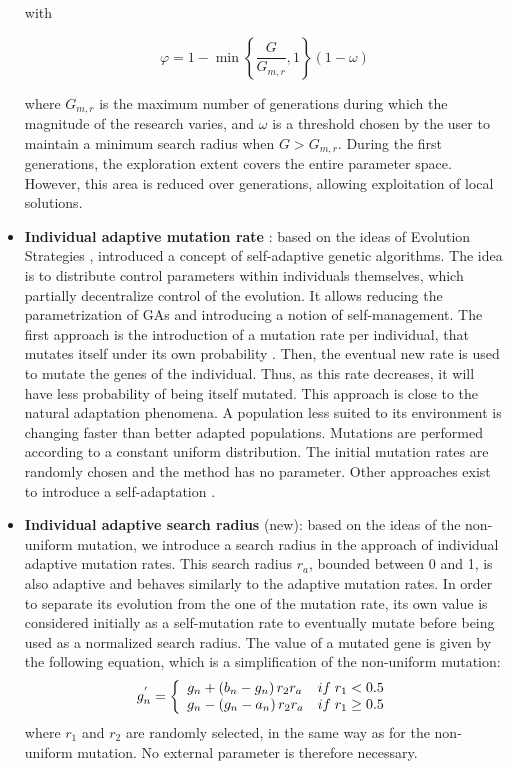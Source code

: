 \documentclass[twocol]{ametsoc}
\begin{document}
\begin{itemize}
	with 
	
	\begin{equation}
	\varphi = 1 - \min \left\lbrace \dfrac{G}{G_{m,r}}, 1 \right\rbrace \left(1-\omega\right)
	\end{equation}
	
	where $G_{m,r}$ is the maximum number of generations during which the magnitude of the research varies, and $\omega$ is a threshold chosen by the user to maintain a minimum search radius when $G>G_{m,r}$. During the first generations, the exploration extent covers the entire parameter space. However, this area is reduced over generations, allowing exploitation of local solutions.
	
	\item \textbf{Individual adaptive mutation rate} \citep{Back1992a}: based on the ideas of Evolution Strategies \citep[see][]{Rechenberg1973, Schwefel1981}, \citet{Back1992a} introduced a concept of self-adaptive genetic algorithms. The idea is to distribute control parameters within individuals themselves, which partially decentralize control of the evolution. It allows reducing the parametrization of GAs and introducing a notion of self-management. The first approach is the introduction of a mutation rate per individual, that mutates itself under its own probability \citep{Back1992a}. Then, the eventual new rate is used to mutate the genes of the individual. Thus, as this rate decreases, it will have less probability of being itself mutated. This approach is close to the natural adaptation phenomena. A population less suited to its environment is changing faster than better adapted populations. Mutations are performed according to a constant uniform distribution. The initial mutation rates are randomly chosen \citep{Back1992a} and the method has no parameter. Other approaches exist to introduce a self-adaptation \citep[see][]{Smith1997a,Deb1999,Deb2001a}.
	
	\item \textbf{Individual adaptive search radius} (new): based on the ideas of the non-uniform mutation, we introduce a search radius in the approach of individual adaptive mutation rates. This search radius $r_{a}$, bounded between 0 and 1, is also adaptive and behaves similarly to the adaptive mutation rates. In order to separate its evolution from the one of the mutation rate, its own value is considered initially as a self-mutation rate to eventually mutate before being used as a normalized search radius. The value of a mutated gene is given by the following equation, which is a simplification of the non-uniform mutation:
	\begin{equation}
	g_{n}^{'} = 
	\left\lbrace \begin{array}{l l} 
	g_{n} + \left(b_{n}-g_{n}\right) r_{2} r_{a} & if \; r_{1} < 0.5 \\
	g_{n} - \left(g_{n}-a_{n}\right) r_{2} r_{a} & if \; r_{1} \geq 0.5 \\
	\end{array} \right.
	\label{equation_mutation_rayon_adaptatif}
	\end{equation}
	where $r_{1}$ and $r_{2}$ are randomly selected, in the same way as for the non-uniform mutation. No external parameter is therefore necessary.
	

\end{itemize}
\end{document}
